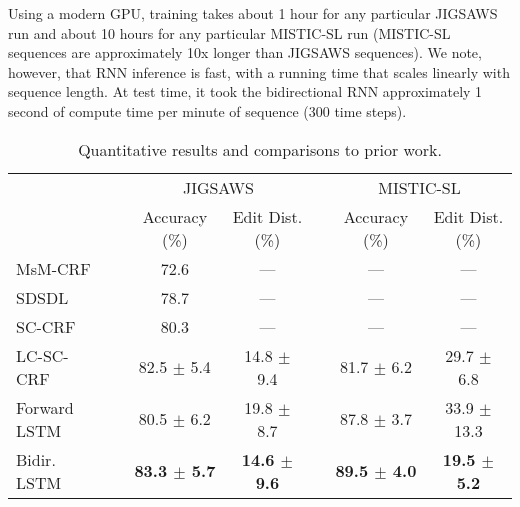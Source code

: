 \documentclass{llncs}
\begin{document}
Using a modern GPU, training takes about 1 hour for any particular JIGSAWS run and about 10 hours for any particular MISTIC-SL run (MISTIC-SL sequences are approximately 10x longer than JIGSAWS sequences). We note, however, that RNN inference is fast, with a running time that scales linearly with sequence length. At test time, it took the bidirectional RNN approximately 1 second of compute time per minute of sequence (300 time steps).

\begin{table*}[t]
\centering
\caption{Quantitative results and comparisons to prior work.}
\label{tab:results}
\renewcommand{\arraystretch}{1.2}
\begin{tabularx}{\textwidth}{@{}lcccccc@{}}
\toprule
                                 & \phantom{x} & \multicolumn{2}{c}{\phantom{xxxxxxxxx}JIGSAWS\phantom{xxxxxxxx}}  & \phantom{xx} & \multicolumn{2}{c}{\phantom{xxxxxxxx}MISTIC-SL\phantom{xxxxxxxx}}  \\
                                                 \cmidrule{3-4}                                                                     \cmidrule{6-7}
                                 &              & Accuracy (\%)            & Edit Dist. (\%)               &              & Accuracy (\%)            & Edit Dist. (\%)          \\[1.5ex]
MsM-CRF \cite{tao2013surgical}   &              & 72.6                     & ---                           &              & ---                      & ---                      \\
SDSDL \cite{sefati2015learning}  &              & 78.7                     & ---                           &              & ---                      & ---                      \\
SC-CRF \cite{lea2015improved}    &              & 80.3                     & ---                           &              & ---                      & ---                      \\
LC-SC-CRF \cite{lea2016learning} &              & 82.5 $\pm$ 5.4           & 14.8 $\pm$ 9.4                &              & 81.7 $\pm$ 6.2           & 29.7 $\pm$ 6.8           \\[1.5ex]
Forward LSTM                     &              & 80.5 $\pm$ 6.2           & 19.8 $\pm$ 8.7                &              & 87.8 $\pm$ 3.7           & 33.9 $\pm$ 13.3          \\
Bidir. LSTM                      &              & \textbf{83.3 $\pm$ 5.7}  & \textbf{14.6 $\pm$ 9.6}       &              & \textbf{89.5 $\pm$ 4.0}  & \textbf{19.5 $\pm$ 5.2}  \\[1.5ex]
\bottomrule
\end{tabularx}
\end{table*}
\end{document}
